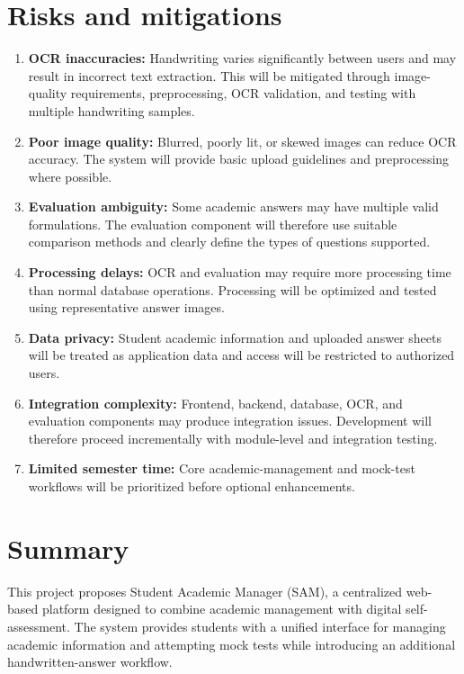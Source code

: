 \documentclass[11pt,a4paper]{article}
\begin{document}
\section{Risks and mitigations}
\begin{enumerate}
    \item \textbf{OCR inaccuracies:} Handwriting varies significantly between users and may result in incorrect text extraction. This will be mitigated through image-quality requirements, preprocessing, OCR validation, and testing with multiple handwriting samples.

    \item \textbf{Poor image quality:} Blurred, poorly lit, or skewed images can reduce OCR accuracy. The system will provide basic upload guidelines and preprocessing where possible.

    \item \textbf{Evaluation ambiguity:} Some academic answers may have multiple valid formulations. The evaluation component will therefore use suitable comparison methods and clearly define the types of questions supported.

    \item \textbf{Processing delays:} OCR and evaluation may require more processing time than normal database operations. Processing will be optimized and tested using representative answer images.

    \item \textbf{Data privacy:} Student academic information and uploaded answer sheets will be treated as application data and access will be restricted to authorized users.

    \item \textbf{Integration complexity:} Frontend, backend, database, OCR, and evaluation components may produce integration issues. Development will therefore proceed incrementally with module-level and integration testing.

    \item \textbf{Limited semester time:} Core academic-management and mock-test workflows will be prioritized before optional enhancements.
\end{enumerate}

\section{Summary}
This project proposes Student Academic Manager (SAM), a centralized web-based platform designed to combine academic management with digital self-assessment. The system provides students with a unified interface for managing academic information and attempting mock tests while introducing an additional handwritten-answer workflow.
\end{document}
